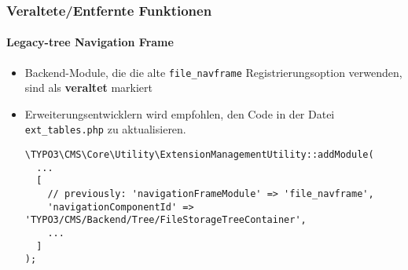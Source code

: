 %

\begin{frame}[fragile]
	\frametitle{Veraltete/Entfernte Funktionen}
	\framesubtitle{Legacy-tree Navigation Frame}


	\begin{itemize}
		\item Backend-Module, die die alte \texttt{file\_navframe}
			Registrierungsoption verwenden, sind als \textbf{veraltet} markiert
		\item Erweiterungsentwicklern wird empfohlen, den Code in der Datei
			\texttt{ext\_tables.php} zu aktualisieren.
\begin{lstlisting}
\TYPO3\CMS\Core\Utility\ExtensionManagementUtility::addModule(
  ...
  [
    // previously: 'navigationFrameModule' => 'file_navframe',
    'navigationComponentId' => 'TYPO3/CMS/Backend/Tree/FileStorageTreeContainer',
    ...
  ]
);
\end{lstlisting}
	\end{itemize}

\end{frame}

